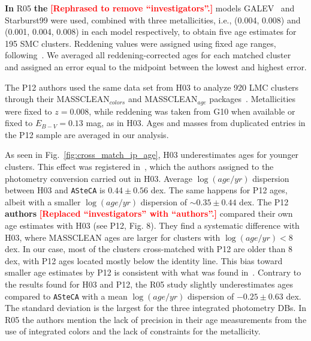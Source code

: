\documentclass[draft]{aa}
\newcommand{\LEt}[1]{\textcolor{red}{\textbf{[#1]}}}
\begin{document}
\textbf{In} R05 \textbf{the} \LEt{Rephrased to remove ``investigators''.}
models GALEV~\citep{Anders_2003} and Starburst99 were used, combined with three
metallicities, i.e., (0.004, 0.008) and (0.001, 0.004, 0.008) in each model
respectively, to obtain five age
estimates for 195 SMC clusters. Reddening values were assigned using fixed age
ranges, following~\cite{Harris_2004}.
%
We averaged all reddening-corrected ages for each matched cluster
and assigned an error equal to the midpoint between the lowest and
highest error.

The P12 authors used the same data set from H03 to analyze 920 LMC clusters
through their MASSCLEAN$_{colors}$ and MASSCLEAN$_{age}$
packages~\citep{Popescu_2010a,Popescu_2010b}. Metallicities were fixed to
$z{=}0.008$, while reddening was taken from G10 when available or fixed to
$E_{B-V}{=}0.13$ mag, as in H03. Ages and masses from duplicated entries in
the P12 sample are averaged in our analysis.


As seen in Fig.~\ref{fig:cross_match_ip_age}, H03 underestimates ages for
younger clusters. This effect was registered in~\citet[][see Fig. 1]
{de_Grijs_2006}, which the authors assigned to the photometry conversion carried out in
H03. Average $\log(age/yr)$ dispersion between H03 and \texttt{ASteCA}
is $0.44{\pm}0.56$ dex.
%
The same happens for P12 ages, albeit with a smaller $\log(age/yr)$ dispersion
of ${\sim}0.35{\pm}0.44$ dex. The P12 \textbf{authors} \LEt{Replaced
``investigators'' with ``authors''.} compared their own age estimates
with H03 (see P12, Fig. 8). They find a systematic difference with H03, where
MASSCLEAN ages are larger for clusters with $\log(age/yr){<}8$ dex. In our case,
most of the clusters cross-matched with P12 are older than 8 dex, with P12 ages
located mostly below the identity line. This bias toward smaller age estimates
by P12 is consistent with what was found in~\cite{Choudhury_2015}.
%
Contrary to the results found for H03 and P12, the R05 study slightly
underestimates ages compared to \texttt{ASteCA} with a mean $\log(age/yr)$
dispersion of $-0.25{\pm}0.63$ dex. The standard deviation is the largest for
the three integrated photometry DBs. In R05 the authors mention the lack of
precision in their age measurements from the use of integrated colors and
the lack of constraints for the metallicity.
\end{document}
